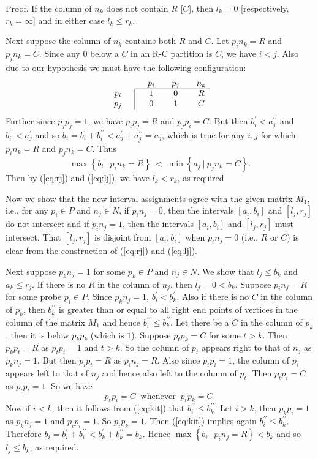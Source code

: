 \documentclass[secthm]{elsart}
\newcommand{\set}[1]{\left\{#1\right\}}
\newcommand{\Set}[2]{\set{#1\ \vert\ #2}}
\begin{document}
\begin{pf*}{Proof.}
If the column of $n_k$ does not contain $R$ [$C$], then $l_k=0$ [respectively, $r_k=\infty$] and in either case $l_k\leqslant r_k$. 

Next suppose the column of $n_k$ contains both $R$ and $C$. Let $p_in_k=R$ and $p_jn_k=C$. Since any $0$ below a $C$ in an R-C partition is $C$, we have $i<j$. Also due to our hypothesis we must have the following configuration:
$$\begin{array}{cc|cccccc}
\multicolumn{3}{c}{} & p_i && p_j && n_k\\ \cline{3-8}
p_i &&& 1 && 0 && R\\
p_j &&& 0 && 1 && C
\end{array}$$
Further since $p_jp_j=1$, we have $p_ip_j=R$ and $p_jp_i=C$. But then $b_i^\prime < a_j^{\prime\prime}$ and $b_i^{\prime\prime} < a_j^\prime$ and so $b_i=b_i^\prime + b_i^{\prime\prime} < a_j^\prime + a_j^{\prime\prime} = a_j$, which is true for any $i,j$ for which $p_in_k=R$ and $p_jn_k=C$. Thus 
$$\max \Set{b_i}{p_in_k=R}\ <\ \min \Set{a_j}{p_jn_k=C}.$$
Then by (\ref{eq:rj}) and (\ref{eq:lj}), we have $l_k<r_k$, as required.

Now we show that the new interval assignments agree with the given matrix $M_1$, i.e., for any $p_i\in P$ and $n_j\in N$, if $p_in_j=0$, then the intervals $[a_i,b_i]$ and $[l_j,r_j]$ do not intersect and if $p_in_j=1$, then the intervals $[a_i,b_i]$ and $[l_j,r_j]$ must intersect. That $[l_j,r_j]$ is disjoint from $[a_i,b_i]$ when $p_in_j=0$ (i.e., $R$ or $C$) is clear from the construction of (\ref{eq:rj}) and (\ref{eq:lj}).

Next suppose $p_kn_j=1$ for some $p_k\in P$ and $n_j\in N$. We show that $l_j\leqslant b_k$ and $a_k\leqslant r_j$. If there is no $R$ in the column of $n_j$, then $l_j=0<b_k$. Suppose $p_in_j=R$ for some probe $p_i\in P$. Since $p_kn_j=1$, $b_i^\prime < b_k^\prime$. Also if there is no $C$ in the  column of $p_k$, then $b_k^{\prime\prime}$ is greater than or equal to all right end points of vertices in the column of the matrix $M_1$ and hence $b_i^{\prime\prime}\leqslant b_k^{\prime\prime}$. Let there be a $C$ in the column of $p_k$, then it is below $p_kp_k$ (which is $1$). Suppose $p_tp_k=C$ for some $t>k$. Then $p_kp_t=R$ as $p_tp_t=1$ and $t>k$. So the column of $p_t$ appears right to that of $n_j$ as $p_kn_j=1$. But then $p_ip_t=R$ as $p_in_j=R$. Also since $p_ip_i=1$, the column of $p_i$ appears left to that of $n_j$ and hence also left to the column of $p_t$. Then $p_tp_i=C$ as $p_tp_t=1$. So we have 
\begin{equation}\label{eq:kit}
p_tp_i=C\ \textrm{ whenever }\ p_tp_k=C.
\end{equation}
Now if $i<k$, then it follows from (\ref{eq:kit}) that $b_i^{\prime\prime}\leqslant b_k^{\prime\prime}$. Let $i>k$, then $p_kp_i=1$ as $p_kn_j=1$ and $p_ip_i=1$. So $p_ip_k=1$. Then (\ref{eq:kit}) implies again $b_i^{\prime\prime}\leqslant b_k^{\prime\prime}$. Therefore $b_i=b_i^\prime + b_i^{\prime\prime} < b_k^\prime + b_k^{\prime\prime} =b_k$. Hence $\max \Set{b_i}{p_in_j=R} < b_k$ and so $l_j\leqslant b_k$, as required.


\end{pf*}
\end{document}
